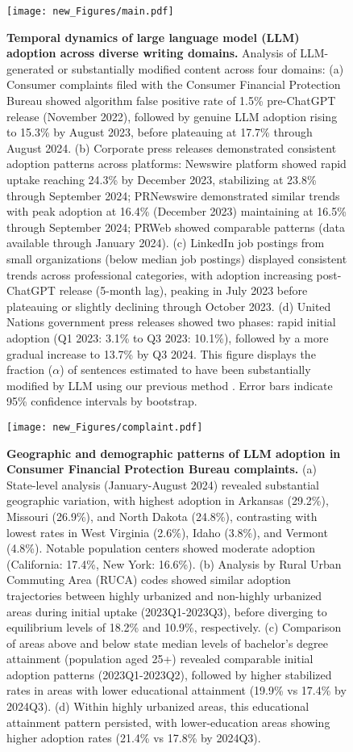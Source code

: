 
\begin{figure}[htb]
\centering
\texttt{[image: new\_Figures/main.pdf]}
\caption{
\textbf{Temporal dynamics of large language model (LLM) adoption across diverse writing domains.}
Analysis of LLM-generated or substantially modified content across four domains: (a) Consumer complaints filed with the Consumer Financial Protection Bureau showed algorithm false positive rate of 1.5\% pre-ChatGPT release (November 2022), followed by genuine LLM adoption rising to 15.3\% by August 2023, before plateauing at 17.7\% through August 2024. (b) Corporate press releases demonstrated consistent adoption patterns across platforms: Newswire platform showed rapid uptake reaching 24.3\% by December 2023, stabilizing at 23.8\% through September 2024; PRNewswire demonstrated similar trends with peak adoption at 16.4\% (December 2023) maintaining at 16.5\% through September 2024; PRWeb showed comparable patterns (data available through January 2024). (c) LinkedIn job postings from small organizations (below median job postings) displayed consistent trends across professional categories, with adoption increasing post-ChatGPT release (5-month lag), peaking in July 2023 before plateauing or slightly declining through October 2023. (d) United Nations government press releases showed two phases: rapid initial adoption (Q1 2023: 3.1\% to Q3 2023: 10.1\%), followed by a more gradual increase to 13.7\% by Q3 2024. This figure displays the fraction ($\alpha$) of sentences estimated to have been substantially modified by LLM using our previous method \cite{liang2024monitoring}. Error bars indicate 95\% confidence intervals by bootstrap.
}
\label{fig:main:1}
\end{figure}

\clearpage
\newpage


\begin{figure}[htb]
\centering
\texttt{[image: new\_Figures/complaint.pdf]}
\caption{
\textbf{Geographic and demographic patterns of LLM adoption in Consumer Financial Protection Bureau complaints.}
(a) State-level analysis (January-August 2024) revealed substantial geographic variation, with highest adoption in Arkansas (29.2\%), Missouri (26.9\%), and North Dakota (24.8\%), contrasting with lowest rates in West Virginia (2.6\%), Idaho (3.8\%), and Vermont (4.8\%). Notable population centers showed moderate adoption (California: 17.4\%, New York: 16.6\%). (b) Analysis by Rural Urban Commuting Area (RUCA) codes showed similar adoption trajectories between highly urbanized and non-highly urbanized areas during initial uptake (2023Q1-2023Q3), before diverging to equilibrium levels of 18.2\% and 10.9\%, respectively. (c) Comparison of areas above and below state median levels of bachelor's degree attainment (population aged 25+) revealed comparable initial adoption patterns (2023Q1-2023Q2), followed by higher stabilized rates in areas with lower educational attainment (19.9\% vs 17.4\% by 2024Q3). (d) Within highly urbanized areas, this educational attainment pattern persisted, with lower-education areas showing higher adoption rates (21.4\% vs 17.8\% by 2024Q3). 
}
\label{fig:main:2}
\end{figure}

